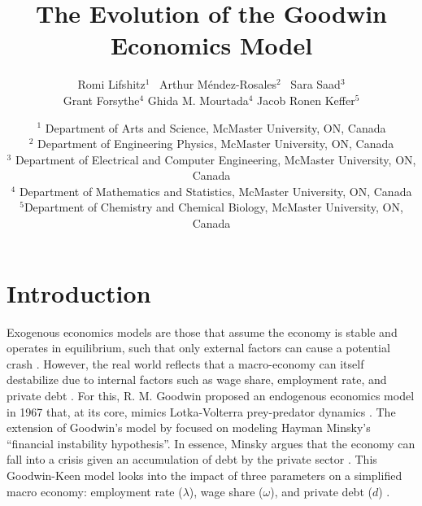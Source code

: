 \documentclass[12pt, centerh1]{article}
\title{The Evolution of the Goodwin Economics Model}
\author{\qquad Romi Lifshitz$^{1}$ \qquad\  Arthur M\'endez-Rosales$^{2}$ \qquad\  Sara Saad$^{3}$ \\ Grant Forsythe$^{4}$ \qquad Ghida M. Mourtada$^{4}$ \qquad Jacob Ronen Keffer$^{5}$}
\date{
{\footnotesize $^1$ Department of Arts and Science, McMaster University, ON, Canada\\[-6pt]
$^2$ Department of Engineering Physics, McMaster University, ON, Canada \\[-6pt]
$^3$ Department of Electrical and Computer Engineering, McMaster University, ON, Canada\\[-6pt]
$^4$ Department of Mathematics and Statistics, McMaster University, ON, Canada\\[-6pt]
$^5$Department of Chemistry and Chemical Biology, McMaster University, ON, Canada\\[-6pt]}
}
\begin{document}
\clearpage\maketitle
\setcounter{page}{1}
\section{Introduction} \label{s:intro}
Exogenous economics models are those that assume the economy is stable and operates in equilibrium, such that only external factors can cause a potential crash \citep{ganti_2019}. However, the real world reflects that a macro-economy can itself destabilize due to internal factors such as wage share, employment rate, and private debt \citep{minsky1992financial}. For this, R. M. Goodwin proposed an endogenous economics model in 1967 that, at its core, mimics Lotka-Volterra prey-predator dynamics \citep{goodwin1982growth}. The extension of Goodwin’s model by \citet{keen1995finance} focused on modeling Hayman Minsky’s “financial instability hypothesis”. In essence, Minsky argues that the economy can fall into a crisis given an accumulation of debt by the private sector \citep{minsky1992financial}. This Goodwin-Keen model looks into the impact of three parameters on a simplified macro economy: employment rate ($\lambda$), wage share ($\omega$), and private debt ($d$) \citep{grasselli2012analysis,maheshwari2015empirical}.
\end{document}
